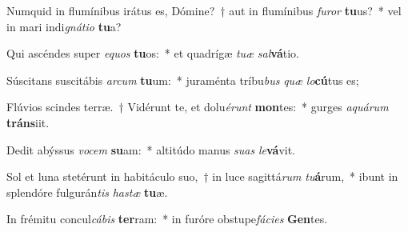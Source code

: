 \item Numquid in flumínibus irátus es, Dómine?~† aut in flumínibus \textit{fu}\textit{ror} \textbf{tu}us?~* vel in mari indi\textit{gná}\textit{ti}\textit{o} \textbf{tu}a?
\item Qui ascéndes super \textit{e}\textit{quos} \textbf{tu}os:~* et quadrígæ \textit{tu}\textit{æ} \textit{sal}\textbf{vá}tio.
\item Súscitans suscitábis \textit{ar}\textit{cum} \textbf{tu}um:~* juraménta tríbu\textit{bus} \textit{quæ} \textit{lo}\textbf{cú}tus es;
\item Flúvios scindes terræ.~† Vidérunt te, et dolu\textit{é}\textit{runt} \textbf{mon}tes:~* gurges \textit{a}\textit{quá}\textit{rum} \textbf{tráns}iit.
\item Dedit abýssus \textit{vo}\textit{cem} \textbf{su}am:~* altitúdo manus \textit{su}\textit{as} \textit{le}\textbf{vá}vit.
\item Sol et luna stetérunt in habitáculo suo,~† in luce sagittá\textit{rum} \textit{tu}\textbf{á}rum,~* ibunt in splendóre fulgurán\textit{tis} \textit{has}\textit{tæ} \textbf{tu}æ.
\item In frémitu concul\textit{cá}\textit{bis} \textbf{ter}ram:~* in furóre obstupe\textit{fá}\textit{ci}\textit{es} \textbf{Gen}tes.
